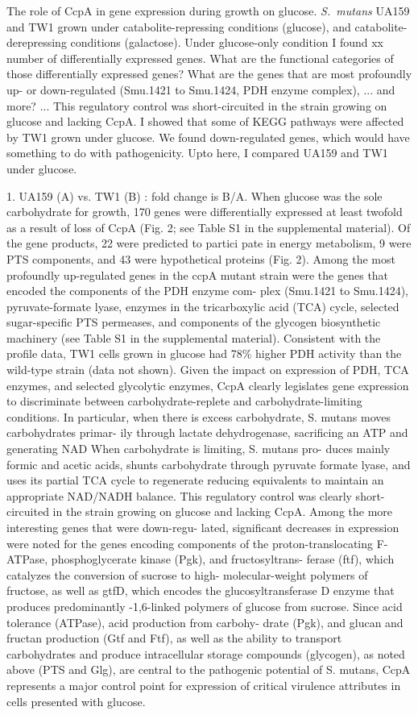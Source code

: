 \documentclass{article}
\begin{document}
The role of CcpA in gene expression during growth on glucose. 
\textit{S.\ mutans} UA159 and TW1 grown under catabolite-repressing conditions
(glucose), and catabolite-derepressing conditions (galactose). Under
glucose-only condition I found xx number of differentially expressed genes. What
are the functional categories of those differentially expressed genes? What are
the genes that are most profoundly up- or down-regulated (Smu.1421 to Smu.1424,
PDH enzyme complex), ... and more? ... This regulatory control was
short-circuited in the strain growing on glucose and lacking CcpA. I showed that
some of KEGG pathways were affected by TW1 grown under glucose. We found
down-regulated genes, which would have something to do with pathogenicity. 
Upto here, I compared UA159 and TW1 under glucose.

1. UA159 (A) vs. TW1 (B) : fold change is B/A.
When glucose was the sole carbohydrate for growth, 170 genes were differentially
expressed at least twofold as a result of loss of CcpA (Fig. 2; see Table S1 in
the supplemental material). Of the gene products, 22 were predicted to partici
pate in energy metabolism, 9 were PTS components, and 43 were hypothetical
proteins (Fig. 2). Among the most profoundly up-regulated genes in the ccpA
mutant strain were the genes that encoded the components of the PDH enzyme com-
plex (Smu.1421 to Smu.1424), pyruvate-formate lyase, enzymes in the
tricarboxylic acid (TCA) cycle, selected sugar-specific PTS permeases, and
components of the glycogen biosynthetic machinery (see Table S1 in the
supplemental material). 
Consistent with the profile data, TW1 cells grown in glucose had 78\% higher
PDH activity than the wild-type strain (data not shown). Given the impact on
expression of PDH, TCA enzymes, and selected glycolytic enzymes, CcpA clearly
legislates gene expression to discriminate between carbohydrate-replete and
carbohydrate-limiting conditions. In particular, when there is excess
carbohydrate, S. mutans moves carbohydrates primar- ily through lactate
dehydrogenase, sacrificing an ATP and generating NAD When carbohydrate is
limiting, S. mutans pro- duces mainly formic and acetic acids, shunts
carbohydrate through pyruvate formate lyase, and uses its partial TCA cycle to
regenerate reducing equivalents to maintain an appropriate NAD/NADH balance.
This regulatory control was clearly short-circuited in the strain growing on
glucose and lacking CcpA.
Among the more interesting genes that were down-regu- lated, significant
decreases in expression were noted for the genes encoding components of the
proton-translocating F-ATPase, phosphoglycerate kinase (Pgk), and
fructosyltrans- ferase (ftf), which catalyzes the conversion of sucrose to high-
molecular-weight polymers of fructose, as well as gtfD, which encodes the
glucosyltransferase D enzyme that produces predominantly -1,6-linked polymers
of glucose from sucrose. Since acid tolerance (ATPase), acid production from
carbohy- drate (Pgk), and glucan and fructan production (Gtf and Ftf), as well
as the ability to transport carbohydrates and produce intracellular storage
compounds (glycogen), as noted above (PTS and Glg), are central to the
pathogenic potential of S. mutans, CcpA represents a major control point for
expression of critical virulence attributes in cells presented with glucose.
\end{document}
